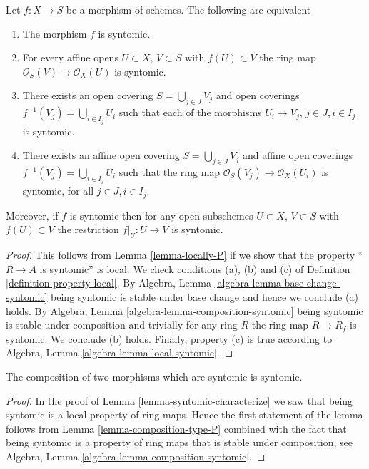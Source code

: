 \begin{lemma}
\label{lemma-syntomic-characterize}
Let $f : X \to S$ be a morphism of schemes.
The following are equivalent
\begin{enumerate}
\item The morphism $f$ is syntomic.
\item For every affine opens $U \subset X$, $V \subset S$
with $f(U) \subset V$ the ring map
$\mathcal{O}_S(V) \to \mathcal{O}_X(U)$ is syntomic.
\item There exists an open covering $S = \bigcup_{j \in J} V_j$
and open coverings $f^{-1}(V_j) = \bigcup_{i \in I_j} U_i$ such
that each of the morphisms $U_i \to V_j$, $j\in J, i\in I_j$
is syntomic.
\item There exists an affine open covering $S = \bigcup_{j \in J} V_j$
and affine open coverings $f^{-1}(V_j) = \bigcup_{i \in I_j} U_i$ such
that the ring map $\mathcal{O}_S(V_j) \to \mathcal{O}_X(U_i)$ is
syntomic, for all $j\in J, i\in I_j$.
\end{enumerate}
Moreover, if $f$ is syntomic then for
any open subschemes $U \subset X$, $V \subset S$ with $f(U) \subset V$
the restriction $f|_U : U \to V$ is syntomic.
\end{lemma}

\begin{proof}
This follows from Lemma \ref{lemma-locally-P} if we show that
the property ``$R \to A$ is syntomic'' is local.
We check conditions (a), (b) and (c) of Definition
\ref{definition-property-local}.
By Algebra, Lemma \ref{algebra-lemma-base-change-syntomic}
being syntomic is stable under base change and hence
we conclude (a) holds. By
Algebra, Lemma \ref{algebra-lemma-composition-syntomic}
being syntomic is stable under composition and trivially for any ring
$R$ the ring map $R \to R_f$ is syntomic.
We conclude (b) holds. Finally, property (c) is true
according to Algebra, Lemma \ref{algebra-lemma-local-syntomic}.
\end{proof}

\begin{lemma}
\label{lemma-composition-syntomic}
The composition of two morphisms which are syntomic is syntomic.
\end{lemma}

\begin{proof}
In the proof of Lemma \ref{lemma-syntomic-characterize}
we saw that being syntomic is a local property of ring maps.
Hence the first statement of the lemma follows from
Lemma \ref{lemma-composition-type-P} combined
with the fact that being syntomic is a property of ring maps that is
stable under composition, see
Algebra, Lemma \ref{algebra-lemma-composition-syntomic}.
\end{proof}

